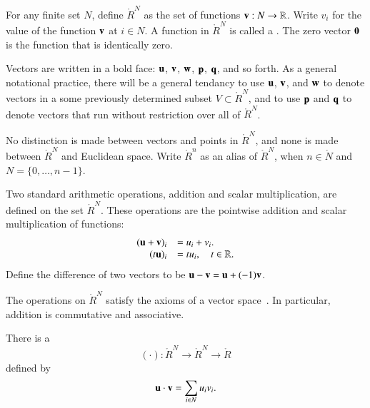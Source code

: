 \begin{definition}
  For any finite set $N$, define $\ring{R}^N$ as the set of functions
  ${\mathbf v}:N\to\mathbb{R}$. Write $v_i$ for the value of the function ${\mathbf v}$ at
  $i\in N$.  %
  A function in $\ring{R}^N$ is called a .  The zero
  vector ${\mathbf 0}$ is the function that is identically zero.
\end{definition}
%
Vectors are written in a bold face: ${\mathbf u}$, ${\mathbf v}$, ${\mathbf w}$, ${\mathbf p}$, ${\mathbf q}$, and
so forth.  As a general notational practice, there will be a general
tendancy to use ${\mathbf u}$, ${\mathbf v}$, and ${\mathbf w}$ to denote vectors in a some
previously determined subset $V\subset \ring{R}^N$, and to use ${\mathbf p}$
and ${\mathbf q}$ to denote vectors that run without restriction over all of
$\ring{R}^N$.

No distinction is made between vectors and points in $\ring{R}^N$, and
none is made between $\ring{R}^N$ and Euclidean space.  Write
$\ring{R}^n$ as an alias of $\ring{R}^N$, when $n\in\ring{N}$ and
$N=\{0,\ldots,n-1\}$.  

\begin{definition}
  Two standard arithmetic operations, addition and scalar
  multiplication, are defined on the set $\ring{R}^N$.  These
  operations are the pointwise addition and scalar multiplication of
  functions:
\begin{equation}
\begin{array}{rll}
(\u + \v)_i &= u_i + v_i.\\
(t \u)_i &= t u_i,\quad t\in\ring{R}.\\  %
\end{array}
\end{equation}
%
%
Define the difference of two vectors to be ${\mathbf u} - {\mathbf v} = {\mathbf u} + (-1) {\mathbf v}$.
%
\end{definition}
The operations on $\ring{R}^N$ 
satisfy the axioms of a vector space~\cite{unknown}. %
In particular, addition is commutative and associative.


\begin{definition}
\label{def:dot}
There is a 
\begin{displaymath}
(\cdot):\ring{R}^N\to\ring{R}^N\to\ring{R}
\end{displaymath}
defined by
\begin{displaymath}
{\mathbf u}\cdot {\mathbf v} = \sum_{i\in N} u_i v_i.
\end{displaymath}
%
%
\end{definition}


